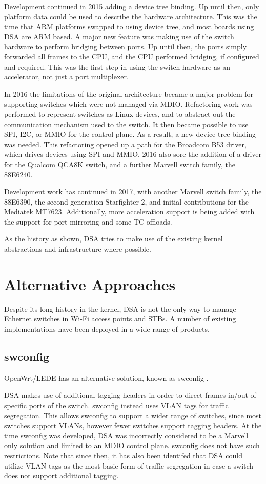 \documentclass[letterpaper]{article}
\begin{document}
Development continued in 2015 adding a device tree binding. Up until
then, only platform data could be used to describe the hardware
architecture. This was the time that ARM platforms swapped to using
device tree, and most boards using DSA are ARM based. A major new
feature was making use of the switch hardware to perform bridging
between ports. Up until then, the ports simply forwarded all frames to
the CPU, and the CPU performed bridging, if configured and
required. This was the first step in using the switch hardware as an
accelerator, not just a port multiplexer.

In 2016 the limitations of the original architecture became a major
problem for supporting switches which were not managed via
MDIO. Refactoring work was performed to represent switches as Linux
devices, and to abstract out the communication mechanism used to the
switch. It then became possible to use SPI, I2C, or MMIO for the
control plane. As a result, a new device tree binding was needed. This
refactoring opened up a path for the Broadcom B53 driver, which drives
devices using SPI and MMIO. 2016 also sore the addition of a driver
for the Qualcom QCA8K switch, and a further Marvell switch family, the
88E6240.

Development work has continued in 2017, with another Marvell switch
family, the 88E6390, the second generation Starfighter 2, and
initial contributions for the Mediatek MT7623. Additionally, more
acceleration support is being added with the support for port
mirroring and some TC offloads.

As the history as shown, DSA tries to make use of the existing kernel
abstractions and infrastructure where possible.

\section{Alternative Approaches}

Despite its long history in the kernel, DSA is not the only way to
manage Ethernet switches in Wi-Fi access points and STBs. A number of
existing implementations have been deployed in a wide range of
products.

\subsection{swconfig}

OpenWrt/LEDE has an alternative solution, known as swconfig \cite{swconfig}.

DSA makes use of additional tagging headers in order to direct frames
in/out of specific ports of the switch. swconfig instead uses VLAN
tags for traffic segregation. This allows swconfig to support a wider
range of switches, since most switches support VLANs, however fewer
switches support tagging headers. At the time swconfig was developed,
DSA was incorrectly considered to be a Marvell only solution and
limited to an MDIO control plane. swconfig does not have such
restrictions. Note that since then, it has also been identifed that
DSA could utilize VLAN tags as the most basic form of traffic
segregation in case a switch does not support additional tagging.
\end{document}
